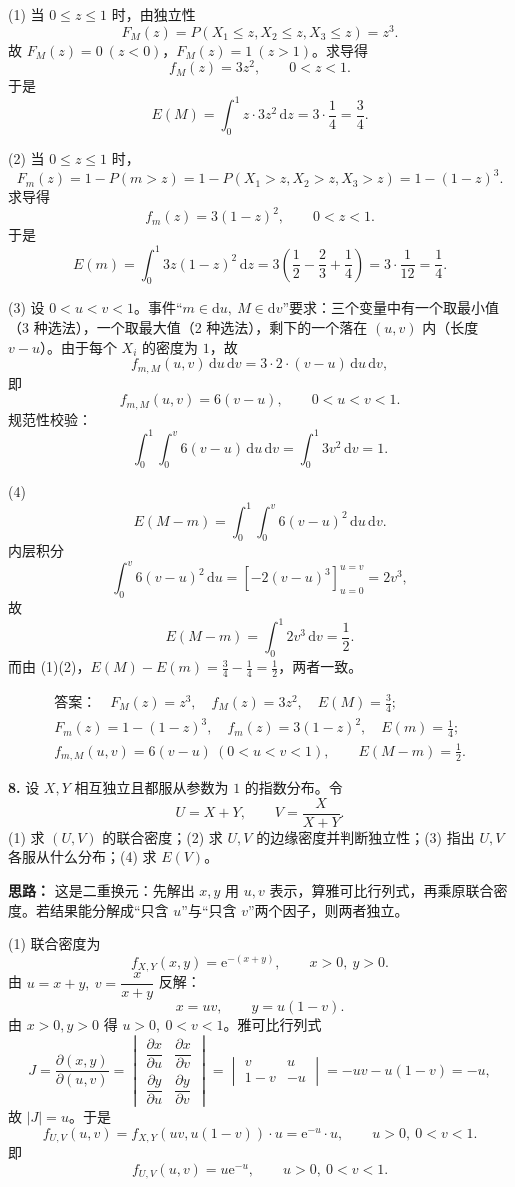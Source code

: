 (1) 当 $0\leq z\leq1$ 时，由独立性
\[
F_M(z)=P(X_1\leq z,X_2\leq z,X_3\leq z)=z^3.
\]
故 $F_M(z)=0\ (z<0)$，$F_M(z)=1\ (z>1)$。求导得
\[
f_M(z)=3z^2,\qquad 0<z<1.
\]
于是
\[
E(M)=\int_0^1 z\cdot3z^2\,\mathrm dz=3\cdot\frac14=\frac34.
\]

(2) 当 $0\leq z\leq1$ 时，
\[
F_m(z)=1-P(m>z)=1-P(X_1>z,X_2>z,X_3>z)=1-(1-z)^3.
\]
求导得
\[
f_m(z)=3(1-z)^2,\qquad 0<z<1.
\]
于是
\[
E(m)=\int_0^1 3z(1-z)^2\,\mathrm dz
=3\left(\frac12-\frac23+\frac14\right)
=3\cdot\frac{1}{12}=\frac14.
\]

(3) 设 $0<u<v<1$。事件“$m\in\mathrm du,\ M\in\mathrm dv$”要求：三个变量中有一个取最小值（3 种选法），一个取最大值（2 种选法），剩下的一个落在 $(u,v)$ 内（长度 $v-u$）。由于每个 $X_i$ 的密度为 $1$，故
\[
f_{m,M}(u,v)\,\mathrm du\,\mathrm dv
=3\cdot 2\cdot(v-u)\,\mathrm du\,\mathrm dv,
\]
即
\[
f_{m,M}(u,v)=6(v-u),\qquad 0<u<v<1.
\]
规范性校验：
\[
\int_0^1\!\!\int_0^v 6(v-u)\,\mathrm du\,\mathrm dv
=\int_0^1 3v^2\,\mathrm dv=1.
\]

(4)
\[
E(M-m)=\int_0^1\!\!\int_0^v 6(v-u)^2\,\mathrm du\,\mathrm dv.
\]
内层积分
\[
\int_0^v 6(v-u)^2\,\mathrm du
=\left[-2(v-u)^3\right]_{u=0}^{u=v}=2v^3,
\]
故
\[
E(M-m)=\int_0^1 2v^3\,\mathrm dv=\frac12.
\]
而由 (1)(2)，$E(M)-E(m)=\frac34-\frac14=\frac12$，两者一致。

\[
\boxed{\begin{gathered}
\textbf{答案：}\quad F_M(z)=z^3,\quad f_M(z)=3z^2,\quad E(M)=\frac34;\\
F_m(z)=1-(1-z)^3,\quad f_m(z)=3(1-z)^2,\quad E(m)=\frac14;\\
f_{m,M}(u,v)=6(v-u)\ (0<u<v<1),\qquad E(M-m)=\frac12.
\end{gathered}}
\]

\else \answerarea[10] \fi%
\textbf{8.} 设 $X,Y$ 相互独立且都服从参数为 $1$ 的指数分布。令
\[
U=X+Y,\qquad V=\frac{X}{X+Y}.
\]
(1) 求 $(U,V)$ 的联合密度；(2) 求 $U,V$ 的边缘密度并判断独立性；(3) 指出 $U,V$ 各服从什么分布；(4) 求 $E(V)$。

\ifshowsolutions%
\textbf{思路：} 这是二重换元：先解出 $x,y$ 用 $u,v$ 表示，算雅可比行列式，再乘原联合密度。若结果能分解成“只含 $u$”与“只含 $v$”两个因子，则两者独立。

(1) 联合密度为
\[
f_{X,Y}(x,y)=\mathrm e^{-(x+y)},\qquad x>0,\ y>0.
\]
由 $u=x+y,\ v=\dfrac{x}{x+y}$ 反解：
\[
x=uv,\qquad y=u(1-v).
\]
由 $x>0,y>0$ 得 $u>0,\ 0<v<1$。雅可比行列式
\[
J=\frac{\partial(x,y)}{\partial(u,v)}
=\begin{vmatrix}
\dfrac{\partial x}{\partial u} & \dfrac{\partial x}{\partial v}\\[6pt]
\dfrac{\partial y}{\partial u} & \dfrac{\partial y}{\partial v}
\end{vmatrix}
=\begin{vmatrix}
v & u\\
1-v & -u
\end{vmatrix}
=-uv-u(1-v)=-u,
\]
故 $|J|=u$。于是
\[
f_{U,V}(u,v)=f_{X,Y}(uv,u(1-v))\cdot u
=\mathrm e^{-u}\cdot u,\qquad u>0,\ 0<v<1.
\]
即
\[
f_{U,V}(u,v)=u\mathrm e^{-u},\qquad u>0,\ 0<v<1.
\]

